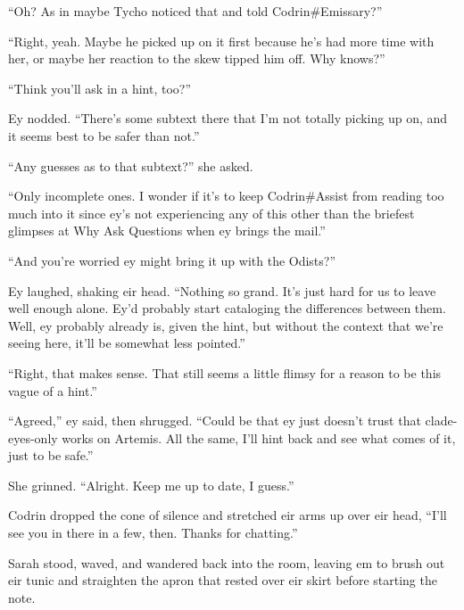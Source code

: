 ``Oh? As in maybe Tycho noticed that and told Codrin\#Emissary?''

``Right, yeah. Maybe he picked up on it first because he's had more time with her, or maybe her reaction to the skew tipped him off. Why knows?''

``Think you'll ask in a hint, too?''

Ey nodded. ``There's some subtext there that I'm not totally picking up on, and it seems best to be safer than not.''

``Any guesses as to that subtext?'' she asked.

``Only incomplete ones. I wonder if it's to keep Codrin\#Assist from reading too much into it since ey's not experiencing any of this other than the briefest glimpses at Why Ask Questions when ey brings the mail.''

``And you're worried ey might bring it up with the Odists?''

Ey laughed, shaking eir head. ``Nothing so grand. It's just hard for us to leave well enough alone. Ey'd probably start cataloging the differences between them. Well, ey probably already is, given the hint, but without the context that we're seeing here, it'll be somewhat less pointed.''

``Right, that makes sense. That still seems a little flimsy for a reason to be this vague of a hint.''

``Agreed,'' ey said, then shrugged. ``Could be that ey just doesn't trust that clade-eyes-only works on Artemis. All the same, I'll hint back and see what comes of it, just to be safe.''

She grinned. ``Alright. Keep me up to date, I guess.''

Codrin dropped the cone of silence and stretched eir arms up over eir head, ``I'll see you in there in a few, then. Thanks for chatting.''

Sarah stood, waved, and wandered back into the room, leaving em to brush out eir tunic and straighten the apron that rested over eir skirt before starting the note.

